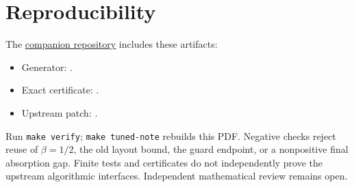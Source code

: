 \documentclass[11pt]{article}
\begin{document}
\section{Reproducibility}
The \href{https://github.com/CrocSwap/integer-mult-bounds}{companion repository}
includes these artifacts:
\begin{itemize}
\item Generator: .
\item Exact certificate: .
\item Upstream patch: .
\end{itemize}
Run \texttt{make verify}; \texttt{make tuned-note} rebuilds this PDF.
Negative checks reject reuse of
$\beta=1/2$, the old layout bound, the guard endpoint, or a nonpositive final
absorption gap. Finite tests and certificates do not independently prove the
upstream algorithmic interfaces. Independent mathematical review remains open.
\end{document}
